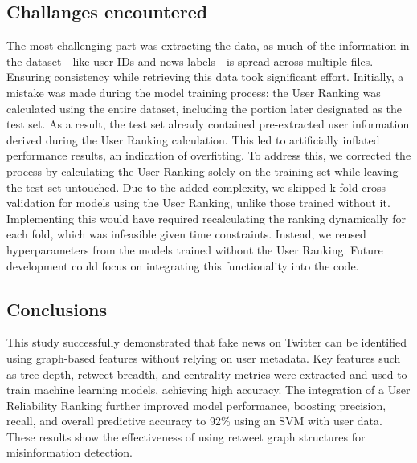 \documentclass[11pt,a4paper]{article}
\begin{document}
\subsection*{Challanges encountered}
The most challenging part was extracting the data, as much of the information in the dataset—like user IDs and news labels—is spread across multiple files. Ensuring consistency while retrieving this data took significant effort. Initially, a mistake was made during the model training process: the User Ranking was calculated using the entire dataset, including the portion later designated as the test set. As a result, the test set already contained pre-extracted user information derived during the User Ranking calculation. This led to artificially inflated performance results, an indication of overfitting. To address this, we corrected the process by calculating the User Ranking solely on the training set while leaving the test set untouched. Due to the added complexity, we skipped k-fold cross-validation for models using the User Ranking, unlike those trained without it. Implementing this would have required recalculating the ranking dynamically for each fold, which was infeasible given time constraints. Instead, we reused hyperparameters from the models trained without the User Ranking. Future development could focus on integrating this functionality into the code.
\subsection*{Conclusions}
This study successfully demonstrated that fake news on Twitter can be identified using graph-based features without relying on user metadata. Key features such as tree depth, retweet breadth, and centrality metrics were extracted and used to train machine learning models, achieving high accuracy. The integration of a User Reliability Ranking further improved model performance, boosting precision, recall, and overall predictive accuracy to 92\% using an SVM with user data.
\\These results show the effectiveness of using retweet graph structures for misinformation detection.







\newpage
\end{document}
